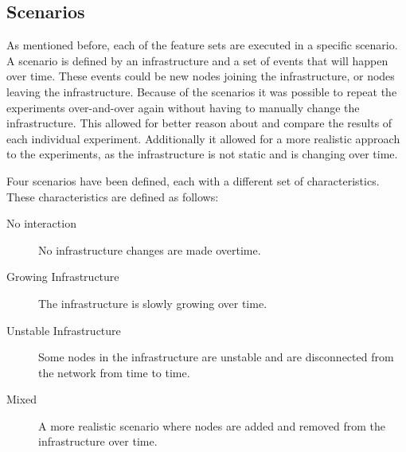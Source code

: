 \subsection*{Scenarios}
As mentioned before, each of the feature sets are executed in a specific scenario. A scenario is defined by an infrastructure and a set of events that will happen over time. These events could be new nodes joining the infrastructure, or nodes leaving the infrastructure. Because of the scenarios it was possible to repeat the experiments over-and-over again without having to manually change the infrastructure. This allowed for better reason about and compare the results of each individual experiment. Additionally it allowed for a more realistic approach to the experiments, as the infrastructure is not static and is changing over time.

Four scenarios have been defined, each with a different set of characteristics. These characteristics are defined as follows:

\begin{description}
    \item[No interaction]             No infrastructure changes are made overtime.
    \item[Growing Infrastructure]     The infrastructure is slowly growing over time.
    \item[Unstable Infrastructure]    Some nodes in the infrastructure are unstable and are disconnected from the network from time to time.
    \item[Mixed]                      A more realistic scenario where nodes are added and removed from the infrastructure over time.
\end{description}




